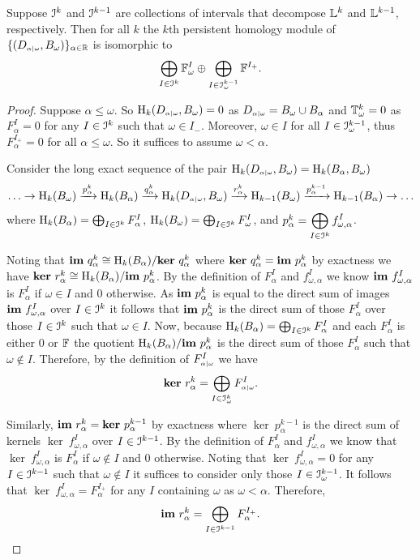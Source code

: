 \begin{lemma}\label{lem:decomposition}
  Suppose ${\mathcal{I}}^k$ and ${\mathcal{I}}^{k-1}$ are collections of intervals that decompose $\mathbb{L}^k$ and $\mathbb{L}^{k-1}$, respectively.
  Then for all $k$ the $k$th persistent homology module of $\{(D_{\scriptscriptstyle \alpha\mid \omega}, B_\omega)\}_{\alpha\in\mathbb{R}}$ is isomorphic to
  \[\bigoplus_{I\in{\mathcal{I}}^k} \mathbb{F}_\omega^I \oplus \bigoplus_{I\in {\mathcal{I}}_\omega^{k-1}} \mathbb{F}^{I_+}.\]
\end{lemma}
\begin{proof}
  Suppose $\alpha\leq\omega$.
  So $\mathrm{H}_k(D_{\scriptscriptstyle \alpha\mid \omega}, B_\omega) = 0$ as $D_{\scriptscriptstyle \alpha\mid \omega} = B_\omega\cup B_\alpha$ and $\mathbb{T}^k_\omega = 0$ as $F_\alpha^I = 0$ for any $I\in {\mathcal{I}}^k$ such that $\omega\in I_-$.
  Moreover, $\omega\in I$ for all $I\in {\mathcal{I}}_\omega^{k-1}$, thus $F_\alpha^{I_+} = 0$ for all $\alpha\leq\omega$.
  So it suffices to assume $\omega < \alpha$.

  Consider the long exact sequence of the pair $\mathrm{H}_k(D_{\scriptscriptstyle \alpha\mid \omega}, B_\omega) = \mathrm{H}_k(B_\alpha, B_\omega)$
  \[ \ldots\to \mathrm{H}_k(B_\omega)\xrightarrow{p_\alpha^k} \mathrm{H}_k(B_\alpha)\xrightarrow{q_\alpha^k}\mathrm{H}_k(D_{\scriptscriptstyle \alpha\mid \omega}, B_\omega)\xrightarrow{r_\alpha^k} \mathrm{H}_{k-1}(B_\omega)\xrightarrow{p_\alpha^{k-1}}\mathrm{H}_{k-1}(B_\alpha)\to\ldots\]
  where $\mathrm{H}_k(B_\alpha) = \bigoplus_{I\in {\mathcal{I}}^k}F_\alpha^I$, $\mathrm{H}_k(B_\omega) = \bigoplus_{I\in {\mathcal{I}}^k}F_\omega^I$, and $p_\alpha^k = \displaystyle\bigoplus_{I\in{\mathcal{I}}^k} f_{\omega,\alpha}^I$.

  Noting that $\mathbf{im}~q_\alpha^k \cong \mathrm{H}_k(B_\alpha) / \mathbf{ker}~q_\alpha^k$ where $\mathbf{ker}~q_\alpha^k = \mathbf{im}~p_\alpha^k$ by exactness we have $\mathbf{ker}~r_\alpha^k \cong \mathrm{H}_k(B_\alpha) / \mathbf{im}~p_\alpha^k$.
  By the definition of $F_\alpha^I$ and $f_{\omega,\alpha}^I$ we know $\mathbf{im}~f_{\omega,\alpha}^I$ is $F_\alpha^I$ if $\omega\in I$ and 0 otherwise.
  As $\mathbf{im}~p_\alpha^k$ is equal to the direct sum of images $\mathbf{im}~f_{\omega,\alpha}^I$ over $I\in{\mathcal{I}}^k$ it follows that $\mathbf{im}~p_\alpha^k$ is the direct sum of those $F_\alpha^I$ over those $I\in{\mathcal{I}}^k$ such that $\omega\in I$.
  Now, because $\mathrm{H}_k(B_\alpha) = \bigoplus_{I\in {\mathcal{I}}^k}F_\alpha^I$ and each $F_\alpha^I$ is either 0 or $\mathbb{F}$ the quotient $\mathrm{H}_k(B_\alpha) / \mathbf{im}~p_\alpha^k$ is the direct sum of those $F_\alpha^I$ such that $\omega\notin I$.
  Therefore, by the definition of $F_{\scriptscriptstyle \alpha\mid \omega}^I$ we have
  \[ \mathbf{ker}~r_\alpha^k = \bigoplus_{I\in{\mathcal{I}}_\omega^k} F_{\scriptscriptstyle \alpha\mid \omega}^I.\]

  Similarly, $\mathbf{im}~r_\alpha^k = \mathbf{ker}~p_\alpha^{k-1}$ by exactness where $\ker~p_\alpha^{k-1}$ is the direct sum of kernels $\ker~f_{\omega,\alpha}^I$ over $I\in{\mathcal{I}}^{k-1}$.
  By the definition of $F_\alpha^I$ and $f_{\omega,\alpha}^I$ we know that $\ker~f_{\omega,\alpha}^I$ is $F_\alpha^I$ if $\omega\notin I$ and $0$ otherwise.
  Noting that $\ker~f_{\omega,\alpha}^I = 0$ for any $I\in {\mathcal{I}}^{k-1}$ such that $\omega\notin I$ it suffices to consider only those $I\in {\mathcal{I}}_\omega^{k-1}$.
  It follows that $\ker~f_{\omega,\alpha}^I = F_\alpha^{I_+}$ for any $I$ containing $\omega$ as $\omega < \alpha$.
  Therefore,
  \[\mathbf{im}~r_\alpha^k = \bigoplus_{I\in{\mathcal{I}}^{k-1}} F_\alpha^{I_+}.\]


\end{proof}

